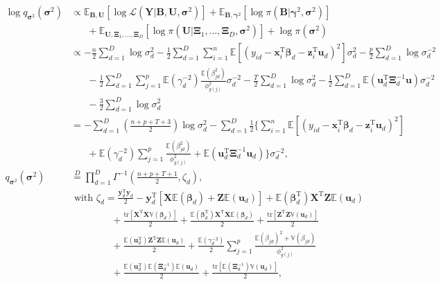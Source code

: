 \documentclass[a4paper,hidelinks]{article}\usepackage[]{graphicx}\usepackage[]{color}
\newcommand{\bbeta}{\bm{\beta}}
\newcommand{\bsigma}{\bm{\sigma}}
\newcommand{\Y}{\mathbf{Y}}
\newcommand{\y}{\mathbf{y}}
\newcommand{\X}{\mathbf{X}}
\newcommand{\x}{\mathbf{x}}
\newcommand{\bgamma}{\bm{\gamma}}
\newcommand{\Z}{\mathbf{Z}}
\newcommand{\B}{\mathbf{B}}
\newcommand{\U}{\mathbf{U}}
\newcommand{\0}{\bm{0}}
\newcommand{\E}{\mathbb{E}}
\newcommand{\V}{\mathbb{V}}
\newcommand{\tr}{^{\text{T}}}
\newcommand{\trace}{\text{tr}}
\renewcommand{\(}{\left(}
\renewcommand{\)}{\right)}
\renewcommand{\[}{\left[}
\renewcommand{\]}{\right]}
\begin{document}
\begin{appendix}
		\begin{align*}
		\log q_{\bsigma^{2}}(\bsigma^{2}) & \propto \E_{\B,\mathbf{U}} [\log \mathcal{L}(\Y | \B, \U, \bsigma^2 )] + \E_{\B, \bgamma^2} [\log \pi (\B | \bgamma^2, \bsigma^2)] \\
		& \,\,\,\,\,\,\,\,\,\, + \E_{\mathbf{U}, \bm{\Xi}_1, \dots, \bm{\Xi}_D} [\log \pi (\mathbf{U} | \bm{\Xi}_1, \dots, \bm{\Xi}_D, \bsigma^2)] + \log \pi (\bsigma^{2}) \\
		& \propto -\frac{n}{2} \sum_{d=1}^D \log \sigma_d^{2} - \frac{1}{2} \sum_{d=1}^D \sum_{i=1}^n \E [(y_{id} - \x_i \tr \bbeta_d - \mathbf{z}_i \tr \mathbf{u}_d)^2] \sigma_d^{2} - \frac{p}{2} \sum_{d=1}^D \log \sigma_d^{-2} \\
		& \,\,\,\,\,\,\,\,\,\, - \frac{1}{2} \sum_{d=1}^D \sum_{j=1}^p \E( \gamma_d^{-2}) \frac{\E ( \beta_{jd}^2)}{\phi_{g(j)}^{2}} \sigma_d^{-2} - \frac{T}{2} \sum_{d=1}^D \log \sigma_d^{2} - \frac{1}{2} \sum_{d=1}^D \E(\mathbf{u}_d \tr \bm{\Xi}_d^{-1} \mathbf{u}) \sigma_d^{-2} \\
		& \,\,\,\,\,\,\,\,\,\, - \frac{3}{2} \sum_{d=1}^D \log \sigma^2_d \\
		& = -\sum_{d=1}^{D} \(\frac{n + p + T + 3}{2} \) \log \sigma_d^{2} - \sum_{d=1}^{D} \frac{1}{2}\Bigg\{ \sum_{i=1}^n \E [(y_{id} - \x_i \tr \bbeta_d - \mathbf{z}_i \tr \mathbf{u}_d)^2] \\
		& \,\,\,\,\,\,\,\,\,\, + \E(\gamma_d^{-2})\sum_{j=1}^p \frac{\E(\beta_{jd}^2)}{\phi_{g(j)}^2} + \E(\mathbf{u}_{d} \tr \bm{\Xi}_d^{-1} \mathbf{u}_d) \Bigg\} \sigma_d^{-2}, \\
		q_{\bsigma^{2}}(\bsigma^{2}) & \overset{D}{=} \prod_{d=1}^D \Gamma^{-1} \(\frac{n + p + T + 1}{2}, \zeta_{d} \), \\
		& \text{ with } \zeta_{d} = \frac{\y_d \tr \y_d}{2} - \y_d \tr [\X \E(\bbeta_d) + \Z \E(\mathbf{u}_d)] + \E(\bbeta_d \tr) \X \tr \Z \E (\mathbf{u}_d) \\
		& \,\,\,\,\,\,\,\,\,\,\,\,\,\,\,\,\,\,\,\,\,\,\,\,\, + \frac{\trace [\X \tr \X \V(\bbeta_d)]}{2} + \frac{\E(\bbeta_d \tr) \X \tr \X \E(\bbeta_d)}{2} + \frac{\trace [\Z \tr \Z \V(\mathbf{u}_d)]}{2} \\
		& \,\,\,\,\,\,\,\,\,\,\,\,\,\,\,\,\,\,\,\,\,\,\,\,\, + \frac{\E(\mathbf{u}_d \tr) \Z \tr \Z \E(\mathbf{u}_d)}{2} + \frac{\E(\gamma_d^{-2})}{2} \sum_{j=1}^p \frac{\E(\beta_{jd})^2 + \V(\beta_{jd})}{\phi_{g(j)}^2} \\
		& \,\,\,\,\,\,\,\,\,\,\,\,\,\,\,\,\,\,\,\,\,\,\,\,\,+ \frac{\E(\mathbf{u}_d \tr) \E(\bm{\Xi}_d^{-1}) \E(\mathbf{u}_d)}{2} + \frac{\trace [\E(\bm{\Xi}_d^{-1}) \V(\mathbf{u}_d)]}{2},
		\end{align*}
		

\end{appendix}
\end{document}
